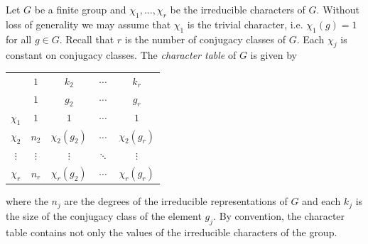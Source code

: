 Let $G$ be a finite group and $\chi_1,\dots,\chi_r$ be the irreducible characters of $G$. Without loss of generality
we may assume that $\chi_1$ is the trivial character, i.e. $\chi_1(g)=1$ for all $g\in G$. 
Recall that $r$ is the number of conjugacy classes of $G$. Each $\chi_j$ is constant on conjugacy classes. 
The \emph{character table} of 
$G$ is given by 
\begin{center}
\begin{tabular}{|c|cccc|}
\hline 
 & $1$ & $k_{2}$ & $\cdots$ & $k_{r}$\tabularnewline
 & $1$ & $g_{2}$ & $\cdots$ & $g_{r}$\tabularnewline
\hline 
$\chi_{1}$ & $1$ & $1$ & $\cdots$ & $1$\tabularnewline
$\chi_{2}$ & $n_{2}$ & $\chi_{2}(g_{2})$ & $\cdots$ & $\chi_{2}(g_{r})$\tabularnewline
$\vdots$ & $\vdots$ & $\vdots$ & $\ddots$ & $\vdots$\tabularnewline
$\chi_{r}$ & $n_{r}$ & $\chi_{r}(g_{2})$ & $\cdots$ & $\chi_{r}(g_{r})$\tabularnewline
\hline
\end{tabular}
\end{center}
where the $n_j$ are the degrees of the irreducible representations of $G$ and each $k_j$ is 
the size of the conjugacy class of the element $g_j$. By convention, the character table
contains not only the values of the irreducible characters of the group. 

